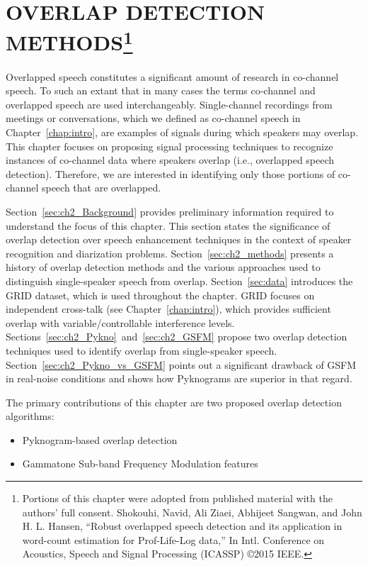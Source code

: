 

\chapter{OVERLAP DETECTION METHODS\thanks{Portions of this chapter were adopted from published material with the authors' full consent. Shokouhi, Navid, Ali Ziaei, Abhijeet Sangwan, and John H. L. Hansen, ``Robust overlapped speech detection and its application in word-count estimation for Prof-Life-Log data,'' In Intl. Conference on Acoustics, Speech and Signal Processing (ICASSP) \copyright 2015 IEEE.}}
\label{chapter:front-end}
Overlapped speech constitutes a significant amount of research in co-channel speech. 
To such an extant that in many cases the terms co-channel and overlapped speech are used interchangeably. Single-channel recordings from meetings or conversations, which we defined as co-channel speech in Chapter~\ref{chap:intro}, are examples of signals during which speakers may overlap. 
This chapter focuses on proposing signal processing techniques to recognize instances of co-channel data where speakers overlap (i.e., overlapped speech detection). Therefore, we are interested in identifying only those portions of co-channel speech that are overlapped. 

Section~\ref{sec:ch2_Background} provides preliminary information required to understand the focus of this chapter. This section states the significance of overlap detection over speech enhancement techniques in the context of speaker recognition and diarization problems. 
Section~\ref{sec:ch2_methods} presents a history of overlap detection methods and the various approaches used to distinguish single-speaker speech from overlap. 
Section~\ref{sec:data} introduces the GRID dataset, which is used throughout the chapter. 
GRID focuses on independent cross-talk (see Chapter~\ref{chap:intro}), which provides sufficient overlap with variable/controllable interference levels. 
Sections~\ref{sec:ch2_Pykno}~and~\ref{sec:ch2_GSFM} propose two overlap detection techniques used to identify overlap from single-speaker speech. 
Section~\ref{sec:ch2_Pykno_vs_GSFM} points out a significant drawback of GSFM in real-noise conditions and shows how Pyknograms are superior in that regard. 

The primary contributions of this chapter are two proposed overlap detection algorithms: 
\begin{itemize}
	\item Pyknogram-based overlap detection
	\item Gammatone Sub-band Frequency Modulation features
\end{itemize}

